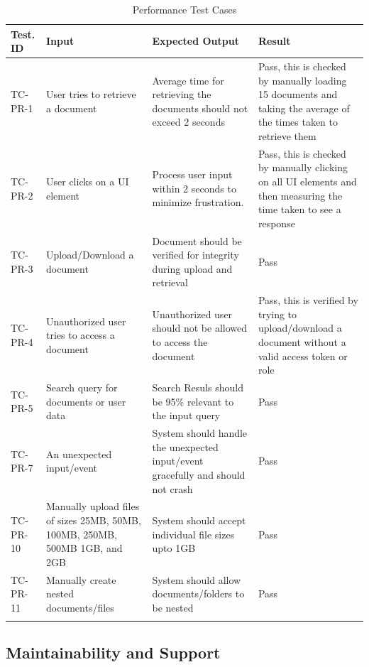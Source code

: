 \documentclass[12pt, titlepage]{article}
\begin{document}
\begin{longtable}{|m{2cm}|m{5cm}|m{4cm}|m{4cm}|}
  \hline
  \textbf{Test. ID} & \textbf{Input} & \textbf{Expected Output} &
  \textbf{Result} \\
  \hline
  TC-PR-1 & User tries to retrieve a document & Average time for
  retrieving the documents should not exceed 2
  seconds & Pass, this is checked by
  manually loading 15 documents and taking the average of the times taken
  to retrieve them\\ \hline
  TC-PR-2 & User clicks on a UI element & Process user
  input within 2 seconds to minimize frustration. & Pass, this is checked by
  manually clicking on all UI elements and then measuring the time taken to
  see a response\\ \hline
  TC-PR-3 & Upload/Download a document & Document should be verified for
  integrity during upload and retrieval & Pass\\ \hline
  TC-PR-4 & Unauthorized user tries to access a document &
  Unauthorized user should not be allowed to access the document &
  Pass, this is verified by trying to upload/download a document
  without a valid access token or role\\ \hline
  TC-PR-5 & Search query for documents or user data & Search Resuls
  should be 95\% relevant to the input query & Pass\\ \hline
  TC-PR-7 & An unexpected input/event & System should handle the
  unexpected input/event gracefully and should not crash & Pass\\ \hline
  TC-PR-10 & Manually upload files of sizes 25MB, 50MB, 100MB, 250MB,
  500MB 1GB, and 2GB  & System should accept individual file sizes
  upto 1GB & Pass \\ \hline
  TC-PR-11 & Manually create nested documents/files & System should
  allow documents/folders to be nested &
  Pass\\ \hline
  \caption{Performance Test Cases}
\end{longtable}

\subsection{Maintainability and Support}
\end{document}
